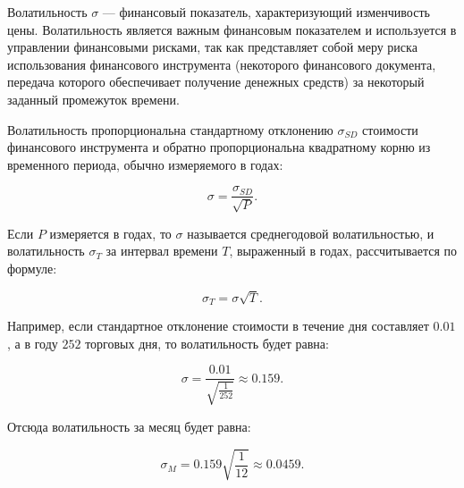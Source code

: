 \documentclass[12pt,a4paper]{amsart}
\begin{document}
Волатильность $\sigma$ --- финансовый показатель, характеризующий
изменчивость цены. Волатильность является важным финансовым показателем
и используется в управлении финансовыми рисками, так как представляет собой
меру риска использования финансового инструмента (некоторого финансового
документа, передача которого обеспечивает получение денежных средств) за
некоторый заданный промежуток времени.

Волатильность пропорциональна стандартному отклонению $\sigma_{SD}$ стоимости
финансового инструмента и обратно пропорциональна квадратному корню из
временного периода, обычно измеряемого в годах:

\[
\sigma = \frac{\sigma_{SD}}{\sqrt{P}}.
\]

Если $P$ измеряется в годах, то $\sigma$ называется среднегодовой
волатильностью, и волатильность $\sigma_T$ за интервал времени $T$,
выраженный в годах, рассчитывается по формуле:

\[
\sigma_T = \sigma \sqrt{T}.
\]

Например, если стандартное отклонение стоимости в течение дня составляет
$0.01$, а в году $252$ торговых дня, то волатильность будет равна:

\[
\sigma = \frac{0.01}{\sqrt{\frac{1}{252}}} \approx 0.159.
\]

Отсюда волатильность за месяц будет равна:

\[
\sigma_M = 0.159 \sqrt{\frac{1}{12}} \approx 0.0459.
\]


\extrasrussian

\end{document}
